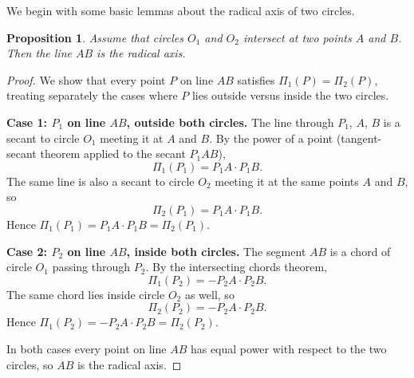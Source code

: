 \documentclass[reqno]{amsart}
\DeclareMathOperator{\1}{\textbf{1}}
\newtheorem{prop}[thm]{Proposition}
\begin{document}
We begin with some basic lemmas about the radical axis of two circles.

\begin{prop}
    Assume that circles $O_1$ and $O_2$ intersect at two points $A$ and $B$.
    Then the line $AB$ is the radical axis. 
\end{prop}

\begin{proof}
We show that every point $P$ on line $AB$ satisfies $\Pi_1(P) = \Pi_2(P)$, treating separately the cases where $P$ lies outside versus inside the two circles.

\begin{center}
\end{center}

\textbf{Case 1: $P_1$ on line $AB$, outside both circles.}
The line through $P_1$, $A$, $B$ is a secant to circle $O_1$ meeting it at $A$ and $B$. By the power of a point (tangent-secant theorem applied to the secant $P_1 A B$),
\[
    \Pi_1(P_1) = P_1A \cdot P_1B.
\]
The same line is also a secant to circle $O_2$ meeting it at the same points $A$ and $B$, so
\[
    \Pi_2(P_1) = P_1A \cdot P_1B.
\]
Hence $\Pi_1(P_1) = P_1A \cdot P_1B = \Pi_2(P_1)$.

\textbf{Case 2: $P_2$ on line $AB$, inside both circles.}
The segment $AB$ is a chord of circle $O_1$ passing through $P_2$. By the intersecting chords theorem,
\[
    \Pi_1(P_2) = -P_2A \cdot P_2B.
\]
The same chord lies inside circle $O_2$ as well, so
\[
    \Pi_2(P_2) = -P_2A \cdot P_2B.
\]
Hence $\Pi_1(P_2) = -P_2A \cdot P_2B = \Pi_2(P_2)$.

In both cases every point on line $AB$ has equal power with respect to the two circles, so $AB$ is the radical axis.
\end{proof}
\end{document}
